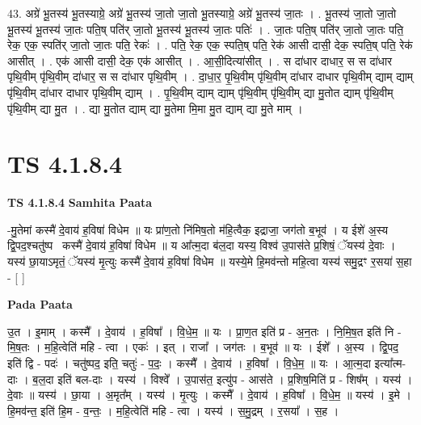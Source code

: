 \documentclass[17pt]{extarticle}
\begin{document}
43. अग्रे॑ भू॒तस्य॑ भू॒तस्याग्रे॒ अग्रे॑ भू॒तस्य॑ जा॒तो जा॒तो भू॒तस्याग्रे॒ अग्रे॑ भू॒तस्य॑ जा॒तः । . भू॒तस्य॑ जा॒तो जा॒तो भू॒तस्य॑ भू॒तस्य॑ जा॒तः पति॒ष् पति॑र् जा॒तो भू॒तस्य॑ भू॒तस्य॑ जा॒तः पतिः॑ । . जा॒तः पति॒ष् पति॑र् जा॒तो जा॒तः पति॒ रेक॒ एक॒ स्पति॑र् जा॒तो जा॒तः पति॒ रेकः॑ । . पति॒ रेक॒ एक॒ स्पति॒ष् पति॒ रेक॑ आसी दासी॒ देक॒ स्पति॒ष् पति॒ रेक॑ आसीत् । . एक॑ आसी दासी॒ देक॒ एक॑ आसीत् । . आ॒सी॒दित्या॑सीत् । . स दा॑धार दाधार॒ स स दा॑धार पृथि॒वीम् पृ॑थि॒वीम् दा॑धार॒ स स दा॑धार पृथि॒वीम् । . दा॒धा॒र॒ पृ॒थि॒वीम् पृ॑थि॒वीम् दा॑धार दाधार पृथि॒वीम् द्याम् द्याम् पृ॑थि॒वीम् दा॑धार दाधार पृथि॒वीम् द्याम् । . पृ॒थि॒वीम् द्याम् द्याम् पृ॑थि॒वीम् पृ॑थि॒वीम् द्या मु॒तोत द्याम् पृ॑थि॒वीम् पृ॑थि॒वीम् द्या मु॒त । . द्या मु॒तोत द्याम् द्या मु॒तेमा मि॒मा मु॒त द्याम् द्या मु॒ते माम् । \newline
\pagebreak
{}

\section{ TS 4.1.8.4 }

\textbf{TS 4.1.8.4 } \newline
\textbf{Samhita Paata} \newline

-मु॒तेमां कस्मै॑ दे॒वाय॑ ह॒विषा॑ विधेम ॥ यः प्रा॑ण॒तो नि॑मिष॒तो म॑हि॒त्वैक॒ इद्राजा॒ जग॑तो ब॒भूव॑ । य ईशे॑ अ॒स्य द्वि॒पद॒श्चतु॑ष्पदः᳡कस्मै॑ दे॒वाय॑ ह॒विषा॑ विधेम ॥ य आ᳚त्म॒दा ब॑ल॒दा यस्य॒ विश्व॑ उ॒पास॑ते प्र॒शिषं॒ ॅयस्य॑ दे॒वाः । यस्य॑ छा॒याऽमृतं॒ ॅयस्य॑ मृ॒त्युः कस्मै॑ दे॒वाय॑ ह॒विषा॑ विधेम ॥ यस्ये॒मे हि॒मव॑न्तो महि॒त्वा यस्य॑ समु॒द्रꣳ र॒सया॑ स॒हा - [  ] \newline

\textbf{Pada Paata} \newline

उ॒त । इ॒माम् । कस्मै᳚ । दे॒वाय॑ । ह॒विषा᳚ । वि॒धे॒म॒ ॥ यः । प्रा॒ण॒त इति॑ प्र - अ॒न॒तः । नि॒मि॒ष॒त इति॑ नि - मि॒ष॒तः । म॒हि॒त्वेति॑ महि - त्वा । एकः॑ । इत् । राजा᳚ । जग॑तः । ब॒भूव॑ ॥ यः । ईशे᳚ । अ॒स्य । द्वि॒पद॒ इति॑ द्वि - पदः॑ । चतु॑ष्पद॒ इति॒ चतुः॑ - प॒दः॒ । कस्मै᳚ । दे॒वाय॑ । ह॒विषा᳚ । वि॒धे॒म॒ ॥ यः । आ॒त्म॒दा इत्या᳚त्म-दाः । ब॒ल॒दा इति॑ बल-दाः । यस्य॑ । विश्वे᳚ । उ॒पास॑त॒ इत्यु॑प - आस॑ते । प्र॒शिष॒मिति॑ प्र - शिष᳚म् । यस्य॑ । दे॒वाः ॥ यस्य॑ । छा॒या । अ॒मृत᳚म् । यस्य॑ । मृ॒त्युः । कस्मै᳚ । दे॒वाय॑ । ह॒विषा᳚ । वि॒धे॒म॒ ॥ यस्य॑ । इ॒मे । हि॒मव॑न्त॒ इति॑ हि॒म - व॒न्तः॒ । म॒हि॒त्वेति॑ महि - त्वा । यस्य॑ । स॒मु॒द्रम् । र॒सया᳚ । स॒ह ।  \newline
\end{document}
